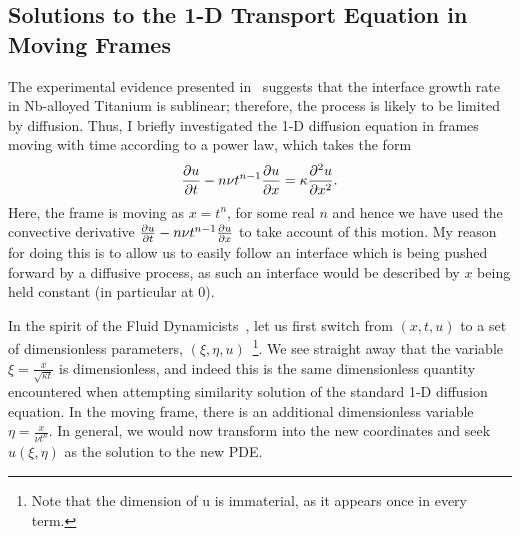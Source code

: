 \subsection{Solutions to the 1-D Transport Equation in Moving Frames}

The experimental evidence presented in~\cite{tegner2015high} suggests that the interface growth rate in Nb-alloyed Titanium is sublinear; therefore, the process is likely to be limited by diffusion. Thus, I briefly investigated the 1-D diffusion equation in frames moving with time according to a power law, which takes the form
\begin{equation}
\frac{\partial u}{\partial t} - n \nu t^{n-1} \frac{\partial u}{\partial x} = \kappa \frac{\partial ^2 u}{\partial x^2}.
\end{equation}
Here, the frame is moving as $x = t^n$, for some real $n$ and hence we have used the convective derivative $ \frac{\partial u}{\partial t} - n \nu t^{n-1} \frac{\partial u}{\partial x} $ to take account of this motion. My reason for doing this is to allow us to easily
follow an interface which is being pushed forward by a diffusive process, as
such an interface would be described by $x$ being held constant (in particular at 0). 

In the spirit of the Fluid Dynamicists~\cite{batchelor2000introduction}, let us first switch from $(x, t, u)$ to a set of dimensionless parameters, $(\xi, \eta, u)$~\footnote{Note that the dimension of u is immaterial, as it appears once in every term.}.
We see straight away that the variable $\xi = \frac{x}{\sqrt{\kappa t}}$ is dimensionless, and indeed this is the same dimensionless quantity encountered when attempting similarity solution of the standard 1-D diffusion equation. In the moving frame, there is an additional dimensionless variable $\eta = \frac{x}{\nu t^n}$. In general, we would now transform into the new coordinates and seek $u(\xi, \eta)$ as the solution to the new PDE.

